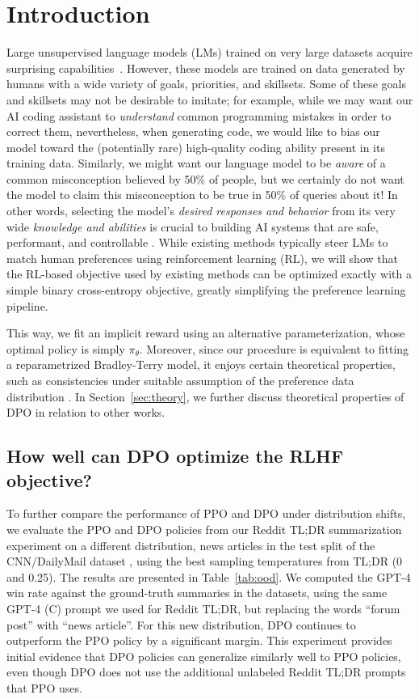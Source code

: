 \section{Introduction}
Large unsupervised language models (LMs) trained on very large datasets acquire surprising capabilities~\citep{chowdhery2022palm, brown2020language, touvron2023llama,bubeck2023sparks}. However, these models are trained on data generated by humans with a wide variety of goals, priorities, and skillsets. Some of these goals and skillsets may not be desirable to imitate; for example, while we may want our AI coding assistant to \textit{understand} common programming mistakes in order to correct them, nevertheless, when generating code, we would like to bias our model toward the (potentially rare) high-quality coding ability present in its training data. Similarly, we might want our language model to be \textit{aware} of a common misconception believed by 50\% of people, but we certainly do not want the model to claim this misconception to be true in 50\% of queries about it! In other words, selecting the model's \emph{desired responses and behavior} from its very wide \textit{knowledge and abilities} is crucial to building AI systems that are safe, performant, and controllable \citep{ouyang2022training}. While existing methods typically steer LMs to match human preferences using reinforcement learning (RL), we will show that the RL-based objective used by existing methods can be optimized exactly with a simple binary cross-entropy objective, greatly simplifying the preference learning pipeline.

This way, we fit an implicit reward using an alternative parameterization, whose optimal policy is simply $\pi_\theta$. Moreover, since our procedure is equivalent to fitting a reparametrized Bradley-Terry model, it enjoys certain theoretical properties, such as consistencies under suitable assumption of the preference data distribution \cite{bong2022generalized}. In Section~\ref{sec:theory}, we further discuss theoretical properties of DPO in relation to other works.

\subsection{How well can DPO optimize the RLHF objective?}

To further compare the performance of PPO and DPO under distribution shifts, we evaluate the PPO and DPO policies from our Reddit TL;DR summarization experiment on a different distribution, news articles in the test split of the CNN/DailyMail dataset \citep{nallapati-etal-2016-abstractive}, using the best sampling temperatures from TL;DR (0 and 0.25). The results are presented in Table~\ref{tab:ood}. We computed the GPT-4 win rate against the ground-truth summaries in the datasets, using the same GPT-4 (C) prompt we used for Reddit TL;DR, but replacing the words ``forum post'' with ``news article''. For this new distribution, DPO continues to outperform the PPO policy by a significant margin. This experiment provides initial evidence that DPO policies can generalize similarly well to PPO policies, even though DPO does not use the additional unlabeled Reddit TL;DR prompts that PPO uses.

